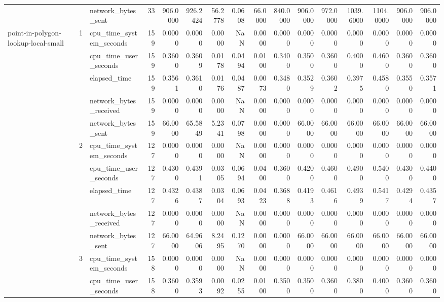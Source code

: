 \begin{tabular}{lllrrrrrrrrrrrrr}
 &  & network\_bytes\_sent & 33 & 906.0000 & 926.2424 & 56.2778 & 0.0608 & 66.0000 & 840.0000 & 906.0000 & 972.0000 & 1039.6000 & 1104.0000 & 906.0000 & 906.0000 \\
\cline{1-16} \cline{2-16}
\multirow[t]{15}{*}{point-in-polygon-lookup-local-small} & \multirow[t]{5}{*}{1} & cpu\_time\_system\_seconds & 159 & 0.0000 & 0.0000 & 0.0000 & NaN & 0.0000 & 0.0000 & 0.0000 & 0.0000 & 0.0000 & 0.0000 & 0.0000 & 0.0000 \\
 &  & cpu\_time\_user\_seconds & 159 & 0.3600 & 0.3609 & 0.0178 & 0.0494 & 0.0100 & 0.3400 & 0.3500 & 0.3600 & 0.4000 & 0.4600 & 0.3600 & 0.3600 \\
 &  & elapsed\_time & 159 & 0.3561 & 0.3610 & 0.0176 & 0.0487 & 0.0073 & 0.3480 & 0.3529 & 0.3602 & 0.3975 & 0.4580 & 0.3550 & 0.3571 \\
 &  & network\_bytes\_received & 159 & 0.0000 & 0.0000 & 0.0000 & NaN & 0.0000 & 0.0000 & 0.0000 & 0.0000 & 0.0000 & 0.0000 & 0.0000 & 0.0000 \\
 &  & network\_bytes\_sent & 159 & 66.0000 & 65.5849 & 5.2341 & 0.0798 & 0.0000 & 0.0000 & 66.0000 & 66.0000 & 66.0000 & 66.0000 & 66.0000 & 66.0000 \\
\cline{2-16}
 & \multirow[t]{5}{*}{2} & cpu\_time\_system\_seconds & 127 & 0.0000 & 0.0000 & 0.0000 & NaN & 0.0000 & 0.0000 & 0.0000 & 0.0000 & 0.0000 & 0.0000 & 0.0000 & 0.0000 \\
 &  & cpu\_time\_user\_seconds & 127 & 0.4300 & 0.4391 & 0.0305 & 0.0694 & 0.0400 & 0.3600 & 0.4200 & 0.4600 & 0.4900 & 0.5400 & 0.4300 & 0.4400 \\
 &  & elapsed\_time & 127 & 0.4326 & 0.4387 & 0.0304 & 0.0693 & 0.0423 & 0.3688 & 0.4193 & 0.4616 & 0.4939 & 0.5417 & 0.4294 & 0.4357 \\
 &  & network\_bytes\_received & 127 & 0.0000 & 0.0000 & 0.0000 & NaN & 0.0000 & 0.0000 & 0.0000 & 0.0000 & 0.0000 & 0.0000 & 0.0000 & 0.0000 \\
 &  & network\_bytes\_sent & 127 & 66.0000 & 64.9606 & 8.2495 & 0.1270 & 0.0000 & 0.0000 & 66.0000 & 66.0000 & 66.0000 & 66.0000 & 66.0000 & 66.0000 \\
\cline{2-16}
 & \multirow[t]{5}{*}{3} & cpu\_time\_system\_seconds & 158 & 0.0000 & 0.0000 & 0.0000 & NaN & 0.0000 & 0.0000 & 0.0000 & 0.0000 & 0.0000 & 0.0000 & 0.0000 & 0.0000 \\
 &  & cpu\_time\_user\_seconds & 158 & 0.3600 & 0.3593 & 0.0092 & 0.0255 & 0.0100 & 0.3500 & 0.3500 & 0.3600 & 0.3800 & 0.4000 & 0.3600 & 0.3600 \\

\end{tabular}
